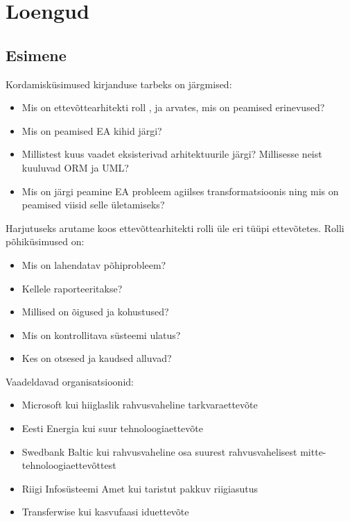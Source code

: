 \documentclass[nobib]{tufte-handout}
\begin{document}
\section{Loengud}
\subsection{Esimene}

Kordamisküsimused kirjanduse tarbeks on järgmised:
\begin{itemize}
	\item Mis on ettevõttearhitekti roll \citeauthor{parsons2005enterprise}, \citeauthor{sysengineering} ja \citeauthor{winter2006essential} arvates, mis on peamised erinevused?
	\item Mis on peamised EA kihid \cite{winter2006essential} järgi?
	\item Millistest kuus vaadet eksisterivad arhitektuurile \citeauthor{sysengineering} järgi? Millisesse neist kuuluvad ORM ja UML?
	\item Mis on \citeauthor{hickey} järgi peamine EA probleem agiilses transformatsioonis ning mis on peamised viisid selle ületamiseks?
\end{itemize}

Harjutuseks arutame koos ettevõttearhitekti rolli üle eri tüüpi ettevõtetes. Rolli põhiküsimused on:
\begin{itemize}
	\item Mis on lahendatav põhiprobleem?
	\item Kellele raporteeritakse?
	\item Millised on õigused ja kohustused?
	\item Mis on kontrollitava süsteemi ulatus?
	\item Kes on otsesed ja kaudsed alluvad?
\end{itemize}

Vaadeldavad organisatsioonid:
\begin{itemize}
	\item Microsoft kui hiiglaslik rahvusvaheline tarkvaraettevõte
	\item Eesti Energia kui suur tehnoloogiaettevõte
	\item Swedbank Baltic kui rahvusvaheline osa suurest rahvusvahelisest mitte-tehnoloogiaettevõttest
	\item Riigi Infosüsteemi Amet kui taristut pakkuv riigiasutus
	\item Transferwise kui kasvufaasi iduettevõte
\end{itemize}
\end{document}
